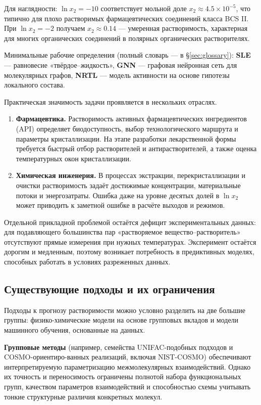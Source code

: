 \documentclass[11pt]{article}
\begin{document}
Для наглядности: $\ln x_2=-10$ соответствует мольной доле $x_2\approx 4.5\times10^{-5}$, что типично для плохо растворимых фармацевтических соединений класса BCS II. При $\ln x_2=-2$ получаем $x_2\approx 0.14$ --- умеренная растворимость, характерная для многих органических соединений в полярных органических растворителях.

Минимальные рабочие определения (полный словарь --- в §\ref{sec:glossary}): \textbf{SLE} --- равновесие «твёрдое--жидкость», \textbf{GNN} --- графовая нейронная сеть для молекулярных графов, \textbf{NRTL} --- модель активности на основе гипотезы локального состава.

Практическая значимость задачи проявляется в нескольких отраслях.

\begin{enumerate}
  \item \textbf{Фармацевтика.} Растворимость активных фармацевтических ингредиентов (API) определяет биодоступность, выбор технологического маршрута и параметры кристаллизации. На этапе разработки лекарственной формы требуется быстрый отбор растворителей и антирастворителей, а также оценка температурных окон кристаллизации.
  \item \textbf{Химическая инженерия.} В процессах экстракции, перекристаллизации и очистки растворимость задаёт достижимые концентрации, материальные потоки и энергозатраты. Ошибка даже на уровне десятых долей в $\ln x_2$ может приводить к заметной ошибке в расчёте выходов и режимов.
\end{enumerate}

Отдельной прикладной проблемой остаётся дефицит экспериментальных данных: для подавляющего большинства пар «растворяемое вещество--растворитель» отсутствуют прямые измерения при нужных температурах. Эксперимент остаётся дорогим и медленным, поэтому возникает потребность в предиктивных моделях, способных работать в условиях разреженных данных.

\subsection{Существующие подходы и их ограничения}

Подходы к прогнозу растворимости можно условно разделить на две большие группы: физико-химические модели на основе групповых вкладов и модели машинного обучения, основанные на данных.

\textbf{Групповые методы} (например, семейства UNIFAC-подобных подходов и COSMO-ориентиро-ванных реализаций, включая NIST-COSMO) обеспечивают интерпретируемую параметризацию межмолекулярных взаимодействий. Однако их точность и переносимость ограничены полнотой набора функциональных групп, качеством параметров взаимодействий и способностью схемы учитывать тонкие структурные различия конкретных молекул.
\end{document}
